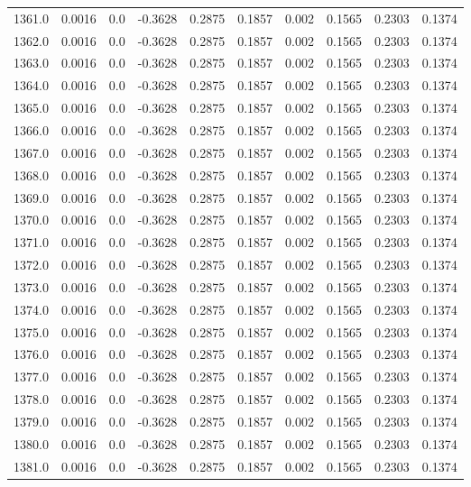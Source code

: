 \begin{longtable}{lrrrrrrrrr}
1361.0 & 0.0016 & 0.0 & -0.3628 & 0.2875 & 0.1857 & 0.002 & 0.1565 & 0.2303 & 0.1374 \\
1362.0 & 0.0016 & 0.0 & -0.3628 & 0.2875 & 0.1857 & 0.002 & 0.1565 & 0.2303 & 0.1374 \\
1363.0 & 0.0016 & 0.0 & -0.3628 & 0.2875 & 0.1857 & 0.002 & 0.1565 & 0.2303 & 0.1374 \\
1364.0 & 0.0016 & 0.0 & -0.3628 & 0.2875 & 0.1857 & 0.002 & 0.1565 & 0.2303 & 0.1374 \\
1365.0 & 0.0016 & 0.0 & -0.3628 & 0.2875 & 0.1857 & 0.002 & 0.1565 & 0.2303 & 0.1374 \\
1366.0 & 0.0016 & 0.0 & -0.3628 & 0.2875 & 0.1857 & 0.002 & 0.1565 & 0.2303 & 0.1374 \\
1367.0 & 0.0016 & 0.0 & -0.3628 & 0.2875 & 0.1857 & 0.002 & 0.1565 & 0.2303 & 0.1374 \\
1368.0 & 0.0016 & 0.0 & -0.3628 & 0.2875 & 0.1857 & 0.002 & 0.1565 & 0.2303 & 0.1374 \\
1369.0 & 0.0016 & 0.0 & -0.3628 & 0.2875 & 0.1857 & 0.002 & 0.1565 & 0.2303 & 0.1374 \\
1370.0 & 0.0016 & 0.0 & -0.3628 & 0.2875 & 0.1857 & 0.002 & 0.1565 & 0.2303 & 0.1374 \\
1371.0 & 0.0016 & 0.0 & -0.3628 & 0.2875 & 0.1857 & 0.002 & 0.1565 & 0.2303 & 0.1374 \\
1372.0 & 0.0016 & 0.0 & -0.3628 & 0.2875 & 0.1857 & 0.002 & 0.1565 & 0.2303 & 0.1374 \\
1373.0 & 0.0016 & 0.0 & -0.3628 & 0.2875 & 0.1857 & 0.002 & 0.1565 & 0.2303 & 0.1374 \\
1374.0 & 0.0016 & 0.0 & -0.3628 & 0.2875 & 0.1857 & 0.002 & 0.1565 & 0.2303 & 0.1374 \\
1375.0 & 0.0016 & 0.0 & -0.3628 & 0.2875 & 0.1857 & 0.002 & 0.1565 & 0.2303 & 0.1374 \\
1376.0 & 0.0016 & 0.0 & -0.3628 & 0.2875 & 0.1857 & 0.002 & 0.1565 & 0.2303 & 0.1374 \\
1377.0 & 0.0016 & 0.0 & -0.3628 & 0.2875 & 0.1857 & 0.002 & 0.1565 & 0.2303 & 0.1374 \\
1378.0 & 0.0016 & 0.0 & -0.3628 & 0.2875 & 0.1857 & 0.002 & 0.1565 & 0.2303 & 0.1374 \\
1379.0 & 0.0016 & 0.0 & -0.3628 & 0.2875 & 0.1857 & 0.002 & 0.1565 & 0.2303 & 0.1374 \\
1380.0 & 0.0016 & 0.0 & -0.3628 & 0.2875 & 0.1857 & 0.002 & 0.1565 & 0.2303 & 0.1374 \\
1381.0 & 0.0016 & 0.0 & -0.3628 & 0.2875 & 0.1857 & 0.002 & 0.1565 & 0.2303 & 0.1374 \\

\end{longtable}
